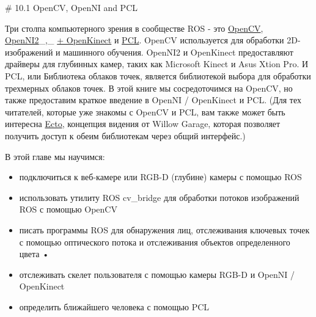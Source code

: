 # 10.1 OpenCV, OpenNI and PCL




Три столпа компьютерного зрения в сообществе ROS - это \href{http://opencv.org/ё}{OpenCV}, \href{http://structure.io/openni}{OpenNI2}_,_ \href{https://github.com/OpenKinect}{+ OpenKinect} и \href{http://pointclouds.org/}{PCL}. OpenCV используется для обработки 2D-изображений и машинного обучения. OpenNI2 и OpenKinect предоставляют драйверы для глубинных камер, таких как Microsoft Kinect и Asus Xtion Pro. И PCL, или Библиотека облаков точек, является библиотекой выбора для обработки трехмерных облаков точек. В этой книге мы сосредоточимся на OpenCV, но также предоставим краткое введение в OpenNI / OpenKinect и PCL. (Для тех читателей, которые уже знакомы с OpenCV и PCL, вам также может быть интересна \href{http://plasmodic.github.com/ecto/}{Ecto}, концепция видения от Willow Garage, которая позволяет получить доступ к обеим библиотекам через общий интерфейс.)

В этой главе мы научимся:

\begin{itemize} 
\item { подключиться к веб-камере или RGB-D (глубине) камеры с помощью ROS } 
\item {  использовать утилиту ROS cv\_bridge для обработки потоков изображений ROS с помощью OpenCV } 
\item { писать программы ROS для обнаружения лиц, отслеживания ключевых точек с помощью оптического потока и отслеживания объектов определенного цвета •} 
\item { отслеживать скелет пользователя с помощью камеры RGB-D и OpenNI / OpenKinect } 
\item { определить ближайшего человека с помощью PCL} 
\end{itemize} 

